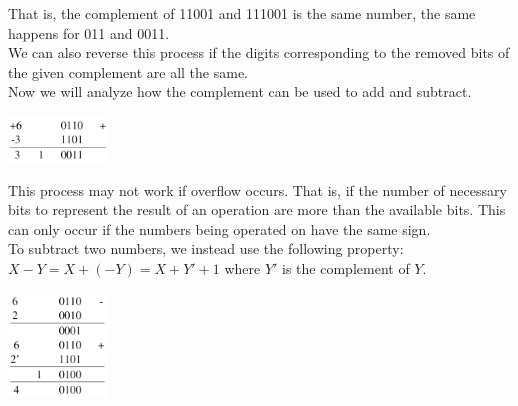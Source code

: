 \documentclass[nobib]{tufte-handout}
\begin{document}
That is, the complement of 11001 and 111001 is the same number, the same happens for 011 and 0011.\\
We can also reverse this process if the digits corresponding to the removed bits of the given complement are all the same.\\
Now we will analyze how the complement can be used to add and subtract.\\
\begin{center}
    \includegraphics[width = 100px]{images/add_complement.png}
\end{center}
This process may not work if overflow occurs. That is, if the number of necessary bits to represent the result of an operation are more than the available bits. This can only occur if the numbers being operated on have the same sign.\\
To subtract two numbers, we instead use the following property: $X-Y = X+(-Y) = X+Y'+1$ where $Y'$ is the complement of $Y$.
\begin{center}
    \includegraphics[width = 100px]{images/complement_subtraction.png}
\end{center}
\end{document}
